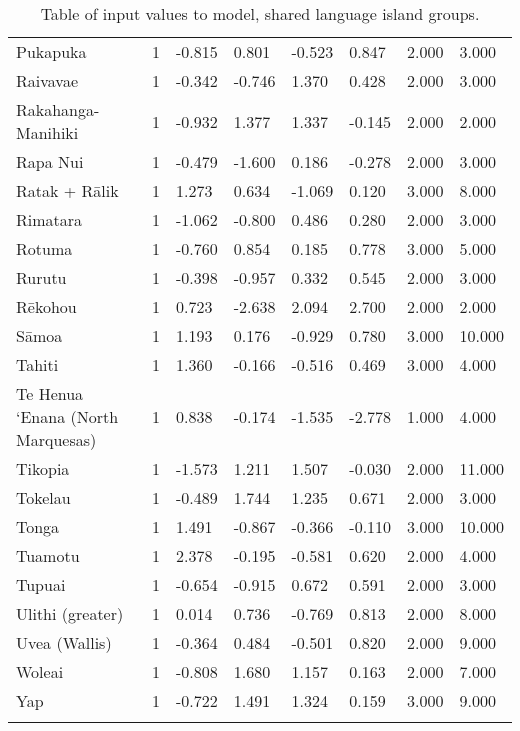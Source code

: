 \begin{longtable}{p{4.5cm}p{1.4cm}p{1.4cm}p{1.4cm}p{1.4cm}p{1.7cm}p{1.7cm}p{1.7cm}}
  Pukapuka & 1 & -0.815 & 0.801 & -0.523 & 0.847 & 2.000 & 3.000 \\ 
  Raivavae & 1 & -0.342 & -0.746 & 1.370 & 0.428 & 2.000 & 3.000 \\ 
  Rakahanga-Manihiki & 1 & -0.932 & 1.377 & 1.337 & -0.145 & 2.000 & 2.000 \\ 
  Rapa Nui & 1 & -0.479 & -1.600 & 0.186 & -0.278 & 2.000 & 3.000 \\ 
  Ratak + Rālik & 1 & 1.273 & 0.634 & -1.069 & 0.120 & 3.000 & 8.000 \\ 
  Rimatara & 1 & -1.062 & -0.800 & 0.486 & 0.280 & 2.000 & 3.000 \\ 
  Rotuma & 1 & -0.760 & 0.854 & 0.185 & 0.778 & 3.000 & 5.000 \\ 
  Rurutu & 1 & -0.398 & -0.957 & 0.332 & 0.545 & 2.000 & 3.000 \\ 
  Rēkohou & 1 & 0.723 & -2.638 & 2.094 & 2.700 & 2.000 & 2.000 \\ 
  Sāmoa & 1 & 1.193 & 0.176 & -0.929 & 0.780 & 3.000 & 10.000 \\ 
  Tahiti & 1 & 1.360 & -0.166 & -0.516 & 0.469 & 3.000 & 4.000 \\ 
  Te Henua ‘Enana (North Marquesas) & 1 & 0.838 & -0.174 & -1.535 & -2.778 & 1.000 & 4.000 \\ 
  Tikopia & 1 & -1.573 & 1.211 & 1.507 & -0.030 & 2.000 & 11.000 \\ 
  Tokelau & 1 & -0.489 & 1.744 & 1.235 & 0.671 & 2.000 & 3.000 \\ 
  Tonga & 1 & 1.491 & -0.867 & -0.366 & -0.110 & 3.000 & 10.000 \\ 
  Tuamotu & 1 & 2.378 & -0.195 & -0.581 & 0.620 & 2.000 & 4.000 \\ 
  Tupuai & 1 & -0.654 & -0.915 & 0.672 & 0.591 & 2.000 & 3.000 \\ 
  Ulithi (greater) & 1 & 0.014 & 0.736 & -0.769 & 0.813 & 2.000 & 8.000 \\ 
  Uvea (Wallis) & 1 & -0.364 & 0.484 & -0.501 & 0.820 & 2.000 & 9.000 \\ 
  Woleai & 1 & -0.808 & 1.680 & 1.157 & 0.163 & 2.000 & 7.000 \\ 
  Yap & 1 & -0.722 & 1.491 & 1.324 & 0.159 & 3.000 & 9.000 \\ 
   \bottomrule
\caption{Table of input values to model, shared language island groups.} 
\label{appendix_medium_table}
\end{longtable}
